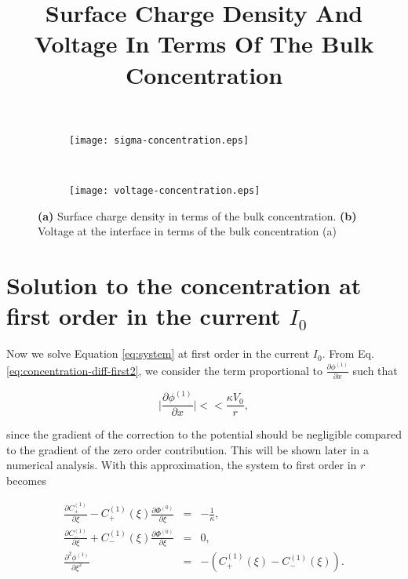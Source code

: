\begin{figure}[htbp!]
\centering
\title{Surface Charge Density And Voltage In Terms Of The Bulk Concentration}
\begin{subfigure}{.7\textwidth}
  \centering
  \texttt{[image: sigma-concentration.eps]}
  \caption{}
  \label{fig:suface-charge-concentration}
\end{subfigure}\\
\begin{subfigure}{.7\textwidth}
  \centering
  \texttt{[image: voltage-concentration.eps]}
  \caption{}
  \label{fig:voltage-concentration}
\end{subfigure}
\caption{\textbf{(a)} Surface charge density in terms of the bulk concentration. \textbf{(b)} Voltage at the interface in terms of the bulk concentration (a)}
\label{fig:voltage_surface}
\end{figure}


\newpage

\section{Solution to the concentration at first order in the current $I_0$}


Now we solve Equation \ref{eq:system} at first order in the current $I_0$. From Eq. \ref{eq:concentration-diff-first2}, we consider the term proportional to $\frac{\partial \phi^{(1)}}{\partial x}$ such that

\begin{equation}
	\bigg|\frac{\partial \phi^{(1)}}{\partial x}\bigg| << \frac{\kappa V_0}{r},
	\label{eq:approx}
\end{equation}

since the gradient of the correction to the potential should be negligible compared to the gradient of the zero order contribution. This will be shown later in a numerical analysis. With this approximation, the system to first order in $r$ becomes

\begin{eqnarray}
\frac{\partial C^{(1)}_+}{\partial \xi}-C^{(1)}_+(\xi)\frac{\partial \Phi^{(0)}}{\partial \xi} &=& -\frac{1}{\kappa}, \\
\label{eq:concentration-diff-first4}
\frac{\partial C^{(1)}_-}{\partial \xi}+C^{(1)}_-(\xi)\frac{\partial \Phi^{(0)}}{\partial \xi} &=& 0, \\
\label{eq:concentration-diff-first5}
\frac{\partial^2  \phi^{(1)}}{\partial \xi^2} &=& -(C^{(1)}_{+}(\xi)-C^{(1)}_{-}(\xi)).
\label{eq:concentration-diff-first6}
\end{eqnarray}



